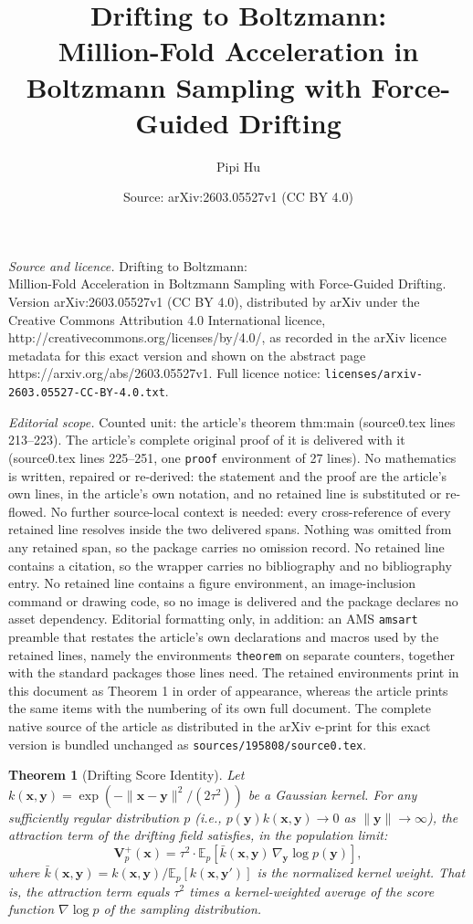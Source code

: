 \documentclass[10pt,a4paper]{amsart}
\title{Drifting to Boltzmann:\\ Million-Fold Acceleration in Boltzmann Sampling with Force-Guided Drifting}
\author{Pipi Hu}
\date{Source: arXiv:2603.05527v1 (CC BY 4.0)}
\newtheorem{theorem}{Theorem}
\newcommand{\E}{\mathbb{E}}
\newcommand{\bV}{\mathbf{V}}
\newcommand{\bx}{\mathbf{x}}
\newcommand{\by}{\mathbf{y}}
\newcommand{\kbar}{\bar{k}}
\begin{document}
\maketitle

\noindent\emph{Source and licence.} Drifting to Boltzmann:\\ Million-Fold Acceleration in Boltzmann Sampling with Force-Guided Drifting. Version arXiv:2603.05527v1 (CC BY 4.0), distributed by arXiv under the Creative Commons Attribution 4.0 International licence, http://creativecommons.org/licenses/by/4.0/, as recorded in the arXiv licence metadata for this exact version and shown on the abstract page https://arxiv.org/abs/2603.05527v1. Full licence notice: \texttt{licenses/arxiv-2603.05527-CC-BY-4.0.txt}.\par\smallskip

\noindent\textit{Editorial scope.} Counted unit: the article's theorem thm:main (source0.tex lines 213--223). The article's complete original proof of it is delivered with it (source0.tex lines 225--251, one \texttt{proof} environment of 27 lines). No mathematics is written, repaired or re-derived: the statement and the proof are the article's own lines, in the article's own notation, and no retained line is substituted or re-flowed.  No further source-local context is needed: every cross-reference of every retained line resolves inside the two delivered spans.  Nothing was omitted from any retained span, so the package carries no omission record.  No retained line contains a citation, so the wrapper carries no bibliography and no bibliography entry.  No retained line contains a figure environment, an image-inclusion command or drawing code, so no image is delivered and the package declares no asset dependency.  Editorial formatting only, in addition: an AMS \texttt{amsart} preamble that restates the article's own declarations and macros used by the retained lines, namely the environments \texttt{theorem} on separate counters, together with the standard packages those lines need.  The retained environments print in this document as Theorem 1 in order of appearance, whereas the article prints the same items with the numbering of its own full document.  The complete native source of the article as distributed in the arXiv e-print for this exact version is bundled unchanged as \texttt{sources/195808/source0.tex}.
\begin{theorem}[Drifting Score Identity]
\label{thm:main}
Let $k(\bx,\by) = \exp(-\|\bx-\by\|^2/(2\tau^2))$ be a Gaussian kernel.
For any sufficiently regular distribution $p$ (i.e., $p(\by)k(\bx,\by) \to 0$ as $\|\by\|\to\infty$), the attraction term of the drifting field satisfies, in the population limit:
\begin{equation}
    \bV_p^+(\bx) = \tau^2 \cdot \E_p\!\left[\kbar(\bx,\by)\,\nabla_\by \log p(\by)\right],
    \label{eq:main-identity}
\end{equation}
where $\kbar(\bx,\by) = k(\bx,\by)/\E_p[k(\bx,\by')]$ is the normalized kernel weight.
That is, the attraction term equals $\tau^2$ times a kernel-weighted average of the score function $\nabla \log p$ of the sampling distribution.
\end{theorem}
\end{document}
